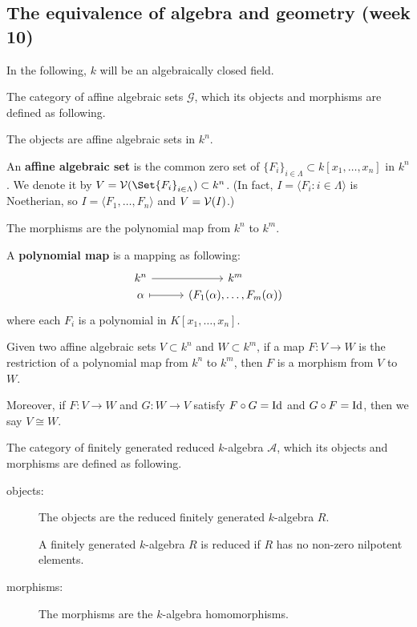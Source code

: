 \subsection{The equivalence of algebra and geometry (week 10)}

In the following, $k$ will be an algebraically closed field.
\begin{definition}
  The category of affine algebraic sets $\mathcal{G}$, which its objects and morphisms are defined as following.

  \begin{description}[leftmargin=0cm]
    \item[objects:] The objects are affine algebraic sets in $k^n$.

    An {\bf affine algebraic set} is the common zero set of $\{ F_i \}_{i \in \Lambda} \subset k[x_1, \dots, x_n]$
    in $k^n$.
    We denote it by $V = \Vc(\Set{F_i}_{i \in \Lambda}) \subset k^n$.
    (In fact, $I = \langle F_i : i \in \Lambda \rangle$ is Noetherian, so
    $I = \langle F_1, \dots, F_n \rangle$ and $V = \mathcal{V}(I)$.)

    \item[morphisms:] The morphisms are the polynomial map from $k^n$ to $k^m$.

      A {\bf polynomial map} is a mapping as following:
      \[
        \begin{tikzcd}[column sep=1cm,row sep=0ex]
            k^n \arrow[r]& k^m \\
           \alpha \arrow[r, mapsto] & (F_1(\alpha), \dots, F_m(\alpha))
        \end{tikzcd}
      \]
      where each $F_i$ is a polynomial in $K[x_1, \dots, x_n]$.

      Given two affine algebraic sets $V \subset k^n$ and $W \subset k^m$, if a map $F: V \to W$ is
      the restriction of a polynomial map from $k^n$ to $k^m$, then $F$ is a morphism from $V$ to $W$.

      Moreover, if $F: V \to W$ and $G : W \to V$ satisfy $F \circ G = {\rm Id}$ and $G \circ F = {\rm Id}$,
      then we say $V \cong W$.
  \end{description}
\end{definition}

\begin{definition}
  The category of finitely generated reduced $k$-algebra $\mathcal{A}$,
  which its objects and morphisms are defined as following.

  \begin{description}
    \item[objects:] The objects are the reduced finitely generated $k$-algebra $R$.

    A finitely generated $k$-algebra $R$ is reduced if $R$ has no non-zero nilpotent elements.

    \item[morphisms:] The morphisms are the $k$-algebra homomorphisms.
  \end{description}
\end{definition}

